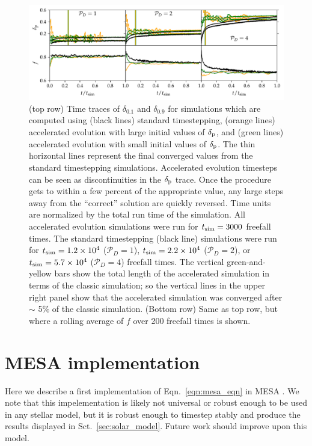 \documentclass[twocolumn]{aastex631}
\newcommand{\delp}{\ensuremath{\delta_{\rm{p}}}}
\newcommand{\mP}{\ensuremath{\mathcal{P}}}
\begin{document}
\begin{figure}[t!]
\centering
\includegraphics[width=\textwidth]{AE_time_figure.pdf}
\caption{
\label{fig:AE_time_figure}
(top row) Time traces of $\delta_{0.1}$ and $\delta_{0.9}$ for simulations which are computed using (black lines) standard timestepping, (orange lines) accelerated evolution with large initial values of $\delp$, and (green lines) accelerated evolution with small initial values of $\delp$.
The thin horizontal lines represent the final converged values from the standard timestepping simulations.
Accelerated evolution timesteps can be seen as discontinuities in the $\delp$ trace.
Once the procedure gets to within a few percent of the appropriate value, any large steps away from the ``correct'' solution are quickly reversed.
Time units are normalized by the total run time of the simulation.
All accelerated evolution simulations were run for $t_{\rm{sim}} = 3000$ freefall times.
The standard timestepping (black line) simulations were run for $t_{\rm{sim}} = 1.2 \times 10^4$ ($\mP_D = 1$), $t_{\rm{sim}} = 2.2 \times 10^4$ ($\mP_D = 2$), or $t_{\rm{sim}} = 5.7 \times 10^4$ ($\mP_D = 4$) freefall times.
The vertical green-and-yellow bars show the total length of the accelerated simulation in terms of the classic simulation; so the vertical lines in the upper right panel show that the accelerated simulation was converged after $\sim$ 5\% of the classic simulation.
(Bottom row) Same as top row, but where a rolling average of $f$ over 200 freefall times is shown.
}
\end{figure}





\section{MESA implementation}
\label{app:mesa}
Here we describe a first implementation of Eqn.~\ref{eqn:mesa_eqn} in MESA \citep{paxton_etal_2011, paxton_etal_2013, paxton_etal_2015, paxton_etal_2018, paxton_etal_2019}.
We note that this impelementation is likely not universal or robust enough to be used in any stellar model, but it is robust enough to timestep stably and produce the results displayed in Sct.~\ref{sec:solar_model}.
Future work should improve upon this model.
\end{document}
